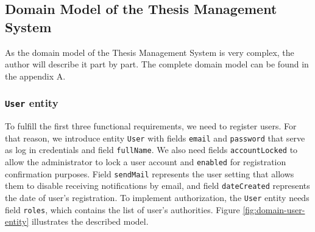 \subsection{Domain Model of the Thesis Management System}
\label{sec:domain-model-tms}

As the domain model of the Thesis Management System is very complex, the author will describe it part by part. The complete domain model can be found in the appendix A.

\subsubsection{\textbf{\texttt{User} entity}}

To fulfill the first three functional requirements, we need to register users. For that reason, we introduce entity \texttt{User} with fields \texttt{email} and \texttt{password} that serve as log in credentials and field \texttt{fullName}. We also need fields \texttt{accountLocked} to allow the administrator to lock a user account and \texttt{enabled} for registration confirmation purposes. Field \texttt{sendMail} represents the user setting that allows them to disable receiving notifications by email, and field \texttt{dateCreated} represents the date of user's registration. To implement authorization, the \texttt{User} entity needs field \texttt{roles}, which contains the list of user's authorities. Figure \ref{fig:domain-user-entity} illustrates the described model.

